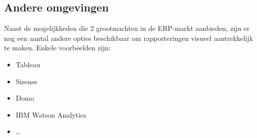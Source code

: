 \subsection{Andere omgevingen}
Naast de mogelijkheden die 2 grootmachten in de ERP-markt aanbieden, zijn er nog een aantal andere opties beschikbaar om rapporteringen visueel aantrekkelijk te maken. Enkele voorbeelden zijn: 

\begin{itemize}
	\item Tableau
	\item Sisense
	\item Domo
	\item IBM Watson Analytics
	\item \ldots
\end{itemize} 
 





